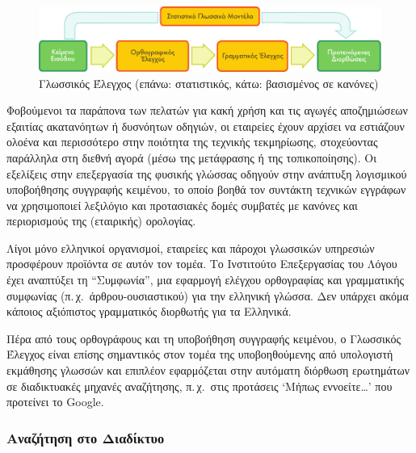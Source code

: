 \documentclass[]{../../metanetpaper}
\begin{document}
\begin{multicols}{2}
\begin{figure}[htb]
  \center
  \includegraphics[width=\textwidth]{../_media/greek/language_checking}
  \caption{Γλωσσικός Έλεγχος (επάνω: στατιστικός, κάτω: βασισμένος σε κανόνες)}
  \label{fig:langcheckingaarch_de}
\end{figure}

Φοβούμενοι τα παράπονα των πελατών για κακή χρήση και τις αγωγές αποζημιώσεων εξαιτίας ακατανόητων ή δυσνόητων οδηγιών, οι εταιρείες έχουν αρχίσει να εστιάζουν ολοένα και περισσότερο  στην ποιότητα της τεχνικής τεκμηρίωσης, στοχεύοντας παράλληλα στη διεθνή αγορά (μέσω της μετάφρασης ή της τοπικοποίησης). Οι εξελίξεις στην επεξεργασία της φυσικής γλώσσας οδηγούν στην ανάπτυξη λογισμικού υποβοήθησης συγγραφής κειμένου, το οποίο βοηθά τον συντάκτη τεχνικών εγγράφων να χρησιμοποιεί λεξιλόγιο και προτασιακές δομές  συμβατές με κανόνες και περιορισμούς της  (εταιρικής) ορολογίας. 

Λίγοι μόνο ελληνικοί οργανισμοί, εταιρείες και πάροχοι γλωσσικών υπηρεσιών προσφέρουν προϊόντα σε αυτόν τον τομέα. Το Ινστιτούτο Επεξεργασίας του Λόγου έχει αναπτύξει τη “Συμφωνία”, μια εφαρμογή ελέγχου ορθογραφίας και γραμματικής συμφωνίας (π.\,χ.~άρθρου-ουσιαστικού)  για την ελληνική γλώσσα. Δεν υπάρχει ακόμα κάποιος αξιόπιστος γραμματικός διορθωτής για τα Ελληνικά.

Πέρα από τους ορθογράφους και τη υποβοήθηση συγγραφής κειμένου, ο Γλωσσικός Έλεγχος είναι επίσης σημαντικός στον τομέα της υποβοηθούμενης από υπολογιστή εκμάθησης γλωσσών και επιπλέον εφαρμόζεται στην αυτόματη διόρθωση ερωτημάτων σε διαδικτυακές μηχανές αναζήτησης, π.\,χ.~στις προτάσεις ‘Μήπως εννοείτε…’ που προτείνει το Google.

\subsubsection{Αναζήτηση στο Διαδίκτυο}


\end{multicols}
\end{document}
